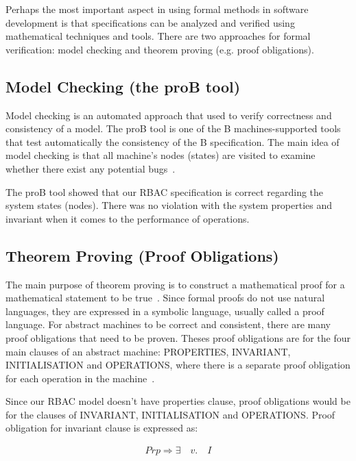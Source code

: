 Perhaps the most important aspect in using formal methods in software development is that specifications can be analyzed and verified using mathematical techniques and tools.  There are two approaches for formal verification: model checking and theorem proving (e.g. proof obligations).

\subsection{Model Checking (the proB tool)}
 
Model checking is an automated approach that used to verify correctness and consistency of a model.  The proB tool is one of the B machines-supported tools that test automatically the consistency of the B specification.  The main idea of model checking is that all machine’s nodes (states) are visited to examine whether there exist any potential bugs~\cite{MMFA2012}.

The proB tool showed that our RBAC specification is correct regarding the system states (nodes).  There was no violation with the system properties and invariant when it comes to the performance of operations.

\subsection{Theorem Proving (Proof Obligations)}
The main purpose of theorem proving is to construct a mathematical proof for a mathematical statement to be true~\cite{Bou2012}.  Since formal proofs do not use natural languages, they are expressed in a symbolic language, usually called a proof language. 
For abstract machines to be correct and consistent, there are many proof obligations that need to be proven.  Theses proof obligations are for the four main clauses of an abstract machine: PROPERTIES, INVARIANT, INITIALISATION and OPERATIONS, where there is a separate proof obligation for each operation in the machine~\cite{MMFA2012}. 


Since our RBAC model doesn’t have properties clause, proof obligations would be for the clauses of INVARIANT, INITIALISATION and OPERATIONS.  Proof obligation for invariant clause is expressed as:

\begin{align*}
Prp \Rightarrow  \exists \quad v. \quad I
\end{align*}

